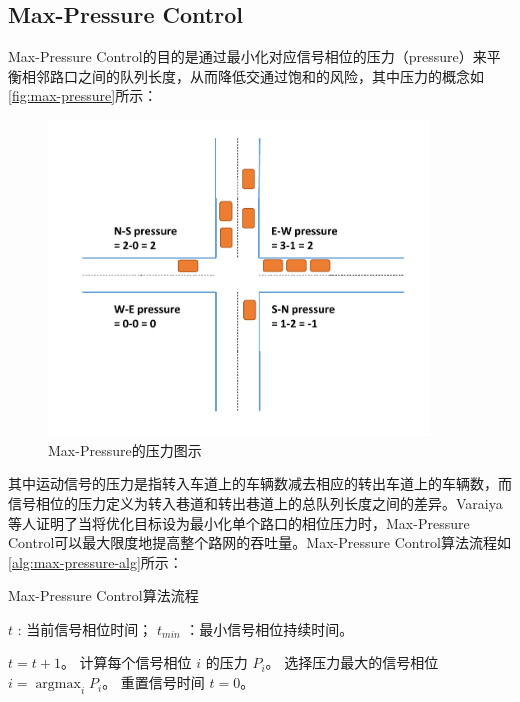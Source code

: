 \subsection{Max-Pressure Control}
Max-Pressure Control\cite{varaiya2013max}的目的是通过最小化对应信号相位的压力（pressure）来平衡相邻路口之间的队列长度，从而降低交通过饱和的风险，其中压力的概念如\autoref{fig:max-pressure}所示：
\begin{figure}[htb]
    \includegraphics[width=0.9\textwidth]{fig/max-pressure.pdf}
    \caption{Max-Pressure的压力图示}
    \label{fig:max-pressure}
\end{figure}
其中运动信号的压力是指转入车道上的车辆数减去相应的转出车道上的车辆数，而信号相位的压力定义为转入巷道和转出巷道上的总队列长度之间的差异。Varaiya\cite{varaiya2013max}等人证明了当将优化目标设为最小化单个路口的相位压力时，Max-Pressure Control可以最大限度地提高整个路网的吞吐量。Max-Pressure Control算法流程如\autoref{alg:max-pressure-alg}所示：
\begin{breakablealgorithm}
    \caption{Max-Pressure Control算法流程}
    \label{alg:max-pressure-alg}
    \begin{algorithmic}[1] %
        \Require 
        $t$ : 当前信号相位时间；
        $t_{min}$ ：最小信号相位持续时间。 

        \State $t = t+1$。
        \State 计算每个信号相位 $i$ 的压力 $P_i$。
        \State 选择压力最大的信号相位 $i=\mathop{\arg\max}_i{P_i}$。
        \State 重置信号时间 $t=0$。
        \EndIf
        \EndFor
    \end{algorithmic}  
\end{breakablealgorithm}  

